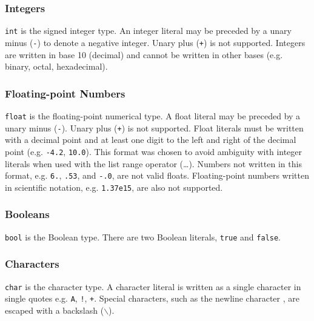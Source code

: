 \documentclass[5pt]{article}
\newcommand{\sq}{\textquotesingle}
\begin{document}
\subsubsection{Integers}
\texttt{int} is the signed integer type. An integer literal may be preceded by a unary minus (\texttt{-}) to denote a negative integer. Unary plus (\texttt{+}) is not supported. Integers are written in base 10 (decimal) and cannot be written in other bases (e.g. binary, octal, hexadecimal).

\subsubsection{Floating-point Numbers}
\texttt{float} is the floating-point numerical type. A float literal may be preceded by a unary minus (\texttt{-}). Unary plus (\texttt{+}) is not supported. Float literals must be written with a decimal point and at least one digit to the left and right of the decimal point (e.g. \texttt{-4.2}, \texttt{10.0}). This format was chosen to avoid ambiguity with integer literals when used with the list range operator (\dots). Numbers not written in this format, e.g. \texttt{6.}, \texttt{.53}, and \texttt{-.0}, are not valid floats. Floating-point numbers written in scientific notation, e.g. \texttt{1.37e15}, are also not supported.
\subsubsection{Booleans}
\texttt{bool} is the Boolean type. There are two Boolean literals, \texttt{true} and \texttt{false}.
\subsubsection{Characters}
\texttt{char} is the character type. A character literal is written as a single character in single quotes e.g. \texttt{\sq A\sq}, \texttt{\sq !\sq}, \texttt{\sq+\sq}. Special characters, such as the newline character \sq\texttt{\string\n}\sq, are escaped with a backslash ($\backslash$).
\end{document}
